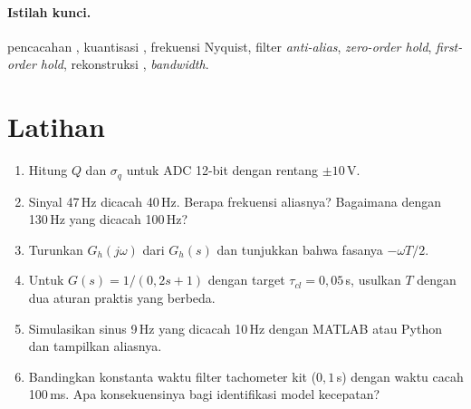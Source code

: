\paragraph{Istilah kunci.} pencacahan , kuantisasi , frekuensi Nyquist, filter \textit{anti-alias}, \textit{zero-order hold}, \textit{first-order hold}, rekonstruksi , \textit{bandwidth}.

\section*{Latihan}
\begin{enumerate}
	\item Hitung $Q$ dan $\sigma_q$ untuk ADC 12-bit dengan rentang $\pm10$\,V.
	\item Sinyal 47\,Hz dicacah 40\,Hz. Berapa frekuensi aliasnya? Bagaimana dengan 130\,Hz yang dicacah 100\,Hz?
	\item Turunkan $G_h(j\omega)$ dari $G_h(s)$ dan tunjukkan bahwa fasanya $-\omega T/2$.
	\item Untuk $G(s) = 1/(0{,}2s+1)$ dengan target $\tau_{cl} = 0{,}05$\,s, usulkan $T$ dengan dua aturan praktis yang berbeda.
	\item Simulasikan sinus 9\,Hz yang dicacah 10\,Hz dengan MATLAB atau Python dan tampilkan aliasnya.
	\item Bandingkan konstanta waktu filter tachometer kit ($0{,}1$\,s) dengan waktu cacah 100\,ms. Apa konsekuensinya bagi identifikasi model kecepatan?
\end{enumerate}
